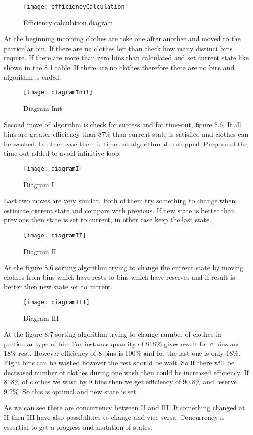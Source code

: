 \begin{figure}[h]
	\centering
		\texttt{[image: efficiencyCalculation]}
	\caption{Efficiency calculation diagram}
	\label{fig:planning}
\end{figure}

At the beginning incoming clothes are toke one after another and moved to the particular bin. If there are no clothes left than check how many distinct bins require. If there are more than zero bins than calculated and set current state like shown in the 8.1 table. If there are no clothes therefore there are no bins and algorithm is ended.

\begin{figure}[h]
	\centering
		\texttt{[image: diagramInit]}
	\caption{Diagram Init}
	\label{fig:planning}
\end{figure}


Second move of algorithm is check for success and for time-out, figure 8.6. If all bins are greater efficiency than 87\% than current state is satisfied and clothes can be washed. In other case there is time-out algorithm also stopped. Purpose of the time-out added to avoid infinitive loop.

\begin{figure}[h]
	\centering
		\texttt{[image: diagramI]}
	\caption{Diagram I}
	\label{fig:planning}
\end{figure}

Last two moves are very similar. Both of them try something to change when estimate current state and compare with previous. If new state is better than previous then state is set to current, in other case keep the last state. 

\begin{figure}[h]
	\centering
		\texttt{[image: diagramII]}
	\caption{Diagram II}
	\label{fig:planning}
\end{figure}

At the figure 8.6 sorting algorithm trying to change the current state by moving clothes from bins which have rests to bins which have reserves and if result is better then new state set to current. 

\begin{figure}[h]
	\centering
		\texttt{[image: diagramIII]}
	\caption{Diagram III}
	\label{fig:planning}
\end{figure}

At the figure 8.7 sorting algorithm trying to change number of clothes in particular type of bin. For instance quantity of 818\% gives result for 8 bins and 18\% rest. However efficiency of 8 bins is 100\% and for the last one is only 18\%. Eight bins can be washed however the rest should be wait. So if there will be decreased number of clothes during one wash then could be increased efficiency. If 818\% of clothes we wash by 9 bins then we get efficiency of 90.8\% and reserve 9.2\%. So this is optimal and new state is set.

As we can see there are concurrency between II and III. If something changed at II then III have also possibilities to change and vice versa. Concurrency is essential to get a progress and mutation of states.